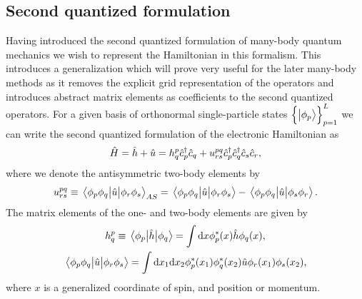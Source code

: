         \subsection{Second quantized formulation}
            Having introduced the second quantized formulation of many-body
            quantum mechanics we wish to represent the Hamiltonian in this
            formalism.
            This introduces a generalization which will prove very useful for
            the later many-body methods as it removes the explicit grid
            representation of the operators and introduces abstract matrix
            elements as coefficients to the second quantized operators.
            For a given basis of orthonormal single-particle states
            $\left\{ \ket{\phi_{p}} \right\}_{p = 1}^{L}$ we can write the second
            quantized formulation of the electronic Hamiltonian as
            \begin{align}
                \hat{H}
                =
                \hat{h}
                + \hat{u}
                =
                h^{p}_{q}
                \hat{c}_{p}^{\dagger}
                \hat{c}_{q}
                +
                u^{pq}_{rs}
                \hat{c}_{p}^{\dagger}
                \hat{c}_{q}^{\dagger}
                \hat{c}_{s}
                \hat{c}_{r},
                \label{eq:electronic-hamiltonian}
            \end{align}
            where we denote the antisymmetric two-body elements by
            \begin{align}
                u^{pq}_{rs}
                \equiv
                \mel{\phi_p\phi_q}{\hat{u}}{\phi_r\phi_s}_{AS}
                =
                \mel{\phi_p\phi_q}{\hat{u}}{\phi_r\phi_s}
                -
                \mel{\phi_p\phi_q}{\hat{u}}{\phi_s\phi_r}.
                \label{eq:antisymmetric_two_body}
            \end{align}
            The matrix elements of the one- and two-body elements are given by
            \begin{gather}
                h^{p}_{q}
                \equiv
                \mel{\phi_{p}}{\hat{h}}{\phi_{q}}
                =
                \int\dd x\phi^{*}_{p}(x)\hat{h}\phi_q(x),
                \\
                \mel{\phi_p\phi_q}{\hat{u}}{\phi_r\phi_s}
                =
                \int\dd x_1\dd x_2
                \phi^{*}_p(x_1)
                \phi^{*}_q(x_2)
                \hat{u}
                \phi_{r}(x_1)
                \phi_{s}(x_2),
            \end{gather}
            where $x$ is a generalized coordinate of spin, and position or
            momentum.

